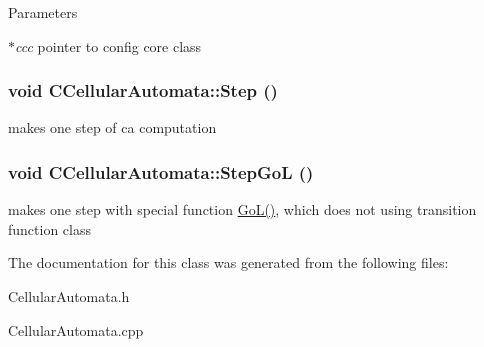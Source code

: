 \begin{DoxyParams}{Parameters}
\item[{\em $\ast$ccc}]pointer to config core class \end{DoxyParams}
\hypertarget{classCCellularAutomata_af5cdf03c18ba644e345daab376d210f9}{
\subsubsection[{Step}]{\setlength{\rightskip}{0pt plus 5cm}void CCellularAutomata::Step ()}}
\label{classCCellularAutomata_af5cdf03c18ba644e345daab376d210f9}
makes one step of ca computation \hypertarget{classCCellularAutomata_a5ec2f3241ecacde9250f140b4d93470c}{
\subsubsection[{StepGoL}]{\setlength{\rightskip}{0pt plus 5cm}void CCellularAutomata::StepGoL ()}}
\label{classCCellularAutomata_a5ec2f3241ecacde9250f140b4d93470c}
makes one step with special function \hyperlink{classCCellularAutomata_a02b47aed358ce08d72171ef555bbe2d3}{GoL()}, which does not using transition function class 

The documentation for this class was generated from the following files:\begin{DoxyCompactItemize}
\item 
CellularAutomata.h\item 
CellularAutomata.cpp\end{DoxyCompactItemize}
